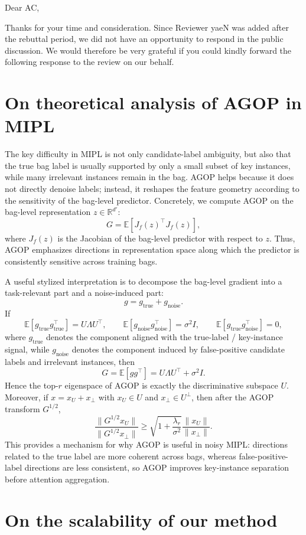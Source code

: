 \documentclass[11pt]{article}
\newcommand{\Rb}{\mathbb{R}}
\newcommand{\Eb}{\mathbb{E}}
\newcommand{\gtrue}{g_{\mathrm{true}}}
\newcommand{\gnoise}{g_{\mathrm{noise}}}
\begin{document}
Dear AC,

Thanks for your time and consideration. Since Reviewer yaeN was added after the rebuttal period, we did not have an opportunity to respond in the public discussion. We would therefore be very grateful if you could kindly forward the following response to the review on our behalf.

\section*{On theoretical analysis of AGOP in MIPL}

The key difficulty in MIPL is not only candidate-label ambiguity, but also that the true bag label is usually supported by only a small subset of key instances, while many irrelevant instances remain in the bag. AGOP helps because it does not directly denoise labels; instead, it reshapes the feature geometry according to the sensitivity of the bag-level predictor. Concretely, we compute AGOP on the bag-level representation $z \in \Rb^{d'}$:
\[
G = \Eb\left[J_f(z)^\top J_f(z)\right],
\]
where $J_f(z)$ is the Jacobian of the bag-level predictor with respect to $z$. Thus, AGOP emphasizes directions in representation space along which the predictor is consistently sensitive across training bags.

A useful stylized interpretation is to decompose the bag-level gradient into a task-relevant part and a noise-induced part:
\[
g = \gtrue + \gnoise.
\]
If
\[
\Eb[\gtrue \gtrue^\top] = U \Lambda U^\top,\qquad
\Eb[\gnoise \gnoise^\top] = \sigma^2 I,\qquad
\Eb[\gtrue \gnoise^\top] = 0,
\]
where $\gtrue$ denotes the component aligned with the true-label / key-instance signal, while $\gnoise$ denotes the component induced by false-positive candidate labels and irrelevant instances, then
\[
G=\Eb[g g^\top] = U\Lambda U^\top + \sigma^2 I.
\]
Hence the top-$r$ eigenspace of AGOP is exactly the discriminative subspace $U$. Moreover, if $x=x_U+x_\perp$ with $x_U\in U$ and $x_\perp\in U^\perp$, then after the AGOP transform $G^{1/2}$,
\[
\frac{\|G^{1/2}x_U\|}{\|G^{1/2}x_\perp\|}
\ge
\sqrt{1+\frac{\lambda_r}{\sigma^2}}
\frac{\|x_U\|}{\|x_\perp\|}.
\]
This provides a mechanism for why AGOP is useful in noisy MIPL: directions related to the true label are more coherent across bags, whereas false-positive-label directions are less consistent, so AGOP improves key-instance separation before attention aggregation.

\section*{On the scalability of our method}
\end{document}
